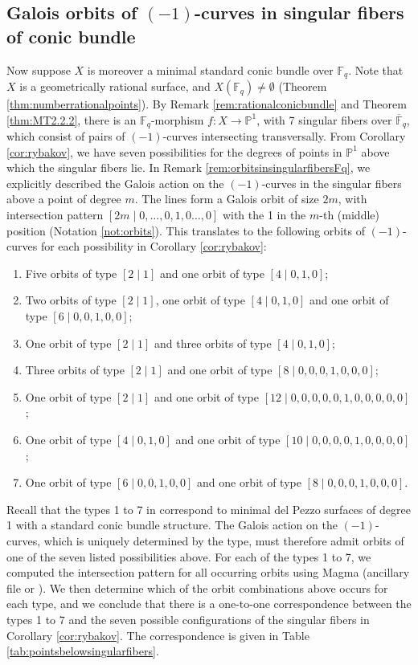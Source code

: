 \documentclass[a4paper, 11pt, reqno]{amsart}
\numberwithin{equation}{section} \numberwithin{figure}{section}
\def \F {{\mathbb F}}
\def \P {{\mathbb P}}
\newcommand{\ra}{\rightarrow}
\theoremstyle{definition}
\numberwithin{lemma}{section}
\begin{document}
\subsection{Galois orbits of $(-1)$-curves in singular fibers of conic bundle}\label{sec:Galoisorbitsfibers}
	
Now suppose $X$ is moreover a minimal standard conic bundle over $\F_q$. Note that $X$ is a geometrically rational surface, and $X(\F_q) \neq \emptyset$ (Theorem \ref{thm:numberrationalpoints}). By Remark \ref{rem:rationalconicbundle} and Theorem \ref{thm:MT2.2.2}, there is an $\F_q$-morphism $f \colon X \ra \P^1$, with 7 singular fibers over $\overline{\F}_q$, which consist of pairs of $(-1)$-curves intersecting transversally. From Corollary \ref{cor:rybakov}, we have seven possibilities for the degrees of points in $\P^1$ above which the singular fibers lie. In Remark \ref{rem:orbitsinsingularfibersFq}, we explicitly described the Galois action on the $(-1)$-curves in the singular fibers above a point of degree $m$. The lines form a Galois orbit of size $2m$, with intersection pattern $[ 2m \mid 0, \ldots, 0, 1, 0 \ldots, 0]$ with the 1 in the $m$-th (middle) position (Notation \ref{not:orbits}). 
This translates to the following orbits of $(-1)$-curves for each possibility in Corollary \ref{cor:rybakov}:
\begin{enumerate}
    \item Five orbits of type $[2 \mid 1]$ and one orbit of type $[4 \mid 0, 1, 0]$;
    \item  Two orbits of type $[2 \mid 1]$, one orbit of type $[4 \mid 0, 1, 0]$ and one orbit of type $[6 \mid 0, 0, 1, 0, 0]$;
    \item One orbit of type $[2 \mid 1]$ and three orbits of type $[4 \mid 0, 1, 0]$;
    \item Three orbits of type $[2 \mid 1]$ and one orbit of type $[8 \mid 0, 0, 0, 1, 0, 0, 0]$;
    \item One orbit of type $[2 \mid 1]$ and one orbit of type $[12 \mid 0, 0, 0, 0, 0, 1, 0, 0, 0, 0, 0]$;
    \item  One orbit of type $[4 \mid 0, 1, 0]$ and one orbit of type $[10 \mid 0, 0, 0, 0, 1, 0, 0, 0, 0]$;
    \item  One orbit of type $[6 \mid 0, 0, 1, 0, 0]$ and one orbit of type $[8 \mid 0, 0, 0, 1, 0, 0, 0]$.
\end{enumerate}

Recall that the types 1 to 7 in \cite[Table 2]{urabe2} correspond to minimal del Pezzo surfaces of degree 1 with a standard conic bundle structure. The Galois action on the $(-1)$-curves, which is uniquely determined by the type, must therefore admit orbits of one of the seven listed possibilities above. For each of the types 1 to 7, we computed the intersection pattern for all occurring orbits using Magma (ancillary file or \cite{github_Existence_dP1}). We then determine which of the orbit combinations above occurs for each type, and we conclude that there is a one-to-one correspondence between the types 1 to 7 and the seven possible configurations of the singular fibers in Corollary \ref{cor:rybakov}. The correspondence is given in Table \ref{tab:pointsbelowsingularfibers}.
\end{document}
